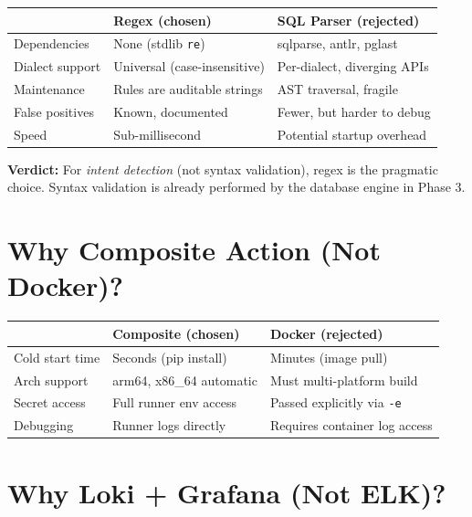 \documentclass[12pt,a4paper]{report}
\begin{document}
\begin{center}
\begin{tabular}{@{}p{5cm}p{4.5cm}p{4.5cm}@{}}
\toprule
& \textbf{Regex (chosen)} & \textbf{SQL Parser (rejected)} \\
\midrule
Dependencies    & None (stdlib \texttt{re}) & sqlparse, antlr, pglast \\
Dialect support & Universal (case-insensitive) & Per-dialect, diverging APIs \\
Maintenance     & Rules are auditable strings & AST traversal, fragile \\
False positives & Known, documented & Fewer, but harder to debug \\
Speed           & Sub-millisecond & Potential startup overhead \\
\bottomrule
\end{tabular}
\end{center}

\textbf{Verdict:} For \emph{intent detection} (not syntax validation), regex is
the pragmatic choice. Syntax validation is already performed by the database
engine in Phase 3.

\section{Why Composite Action (Not Docker)?}

\begin{center}
\begin{tabular}{@{}p{5cm}p{4.5cm}p{4.5cm}@{}}
\toprule
& \textbf{Composite (chosen)} & \textbf{Docker (rejected)} \\
\midrule
Cold start time & Seconds (pip install) & Minutes (image pull) \\
Arch support    & arm64, x86\_64 automatic & Must multi-platform build \\
Secret access   & Full runner env access & Passed explicitly via \texttt{-e} \\
Debugging       & Runner logs directly & Requires container log access \\
\bottomrule
\end{tabular}
\end{center}

\section{Why Loki + Grafana (Not ELK)?}
\end{document}
